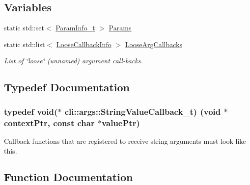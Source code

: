 \subsection*{Variables}
\begin{DoxyCompactItemize}
\item 
static std\+::set$<$ \hyperlink{structcli_1_1args_1_1_param_info__t}{Param\+Info\+\_\+t} $>$ \hyperlink{namespacecli_1_1args_a43c3c64c7b753520c2217c84bef26b75}{Params}
\item 
static std\+::list$<$ \hyperlink{structcli_1_1args_1_1_loose_callback_info}{Loose\+Callback\+Info} $>$ \hyperlink{namespacecli_1_1args_ad3fba01ff2dca1eb79674daf1ccf0f87}{Loose\+Arg\+Callbacks}
\begin{DoxyCompactList}\small\item\em List of \char`\"{}loose\char`\"{} (unnamed) argument call-\/backs. \end{DoxyCompactList}\end{DoxyCompactItemize}


\subsection{Typedef Documentation}
\subsubsection[{\texorpdfstring{String\+Value\+Callback\+\_\+t}{StringValueCallback_t}}]{\setlength{\rightskip}{0pt plus 5cm}typedef {\bf void}($\ast$ cli\+::args\+::\+String\+Value\+Callback\+\_\+t) ({\bf void} $\ast$context\+Ptr, const char $\ast$value\+Ptr)}\hypertarget{namespacecli_1_1args_aa08565ab872ff119b0a21d4bbe1d8e4e}{}\label{namespacecli_1_1args_aa08565ab872ff119b0a21d4bbe1d8e4e}
Callback functions that are registered to receive string arguments must look like this. 

\subsection{Function Documentation}
